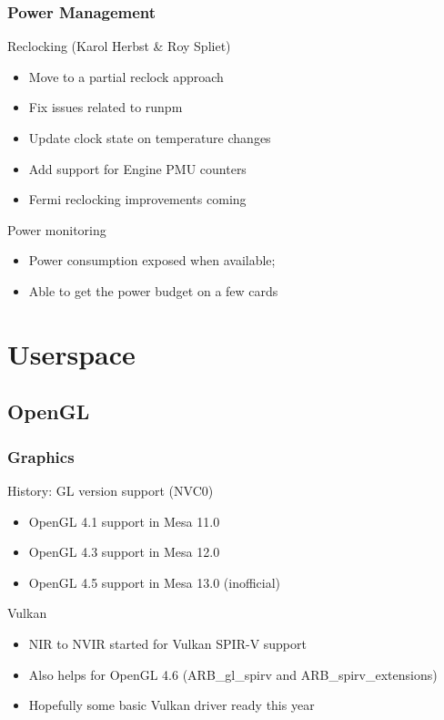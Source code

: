 \documentclass[11pt,english,compress]{beamer}
\begin{document}
\begin{frame}
	\frametitle{Power Management}

	\begin{block}{Reclocking (Karol Herbst \& Roy Spliet)}
		\begin{itemize}
			\item Move to a partial reclock approach
			\item Fix issues related to runpm
			\item Update clock state on temperature changes
			\item Add support for Engine PMU counters
			\item Fermi reclocking improvements coming
		\end{itemize}
	\end{block}

	\begin{block}{Power monitoring}
		\begin{itemize}
			\item Power consumption exposed when available;
			\item Able to get the power budget on a few cards
		\end{itemize}
	\end{block}
\end{frame}

\section{Userspace}
\subsection{OpenGL}

\begin{frame}
	\frametitle{Graphics}

	\begin{block}{History: GL version support (NVC0)}
		\begin{itemize}
			\item OpenGL 4.1 support in Mesa 11.0
			\item OpenGL 4.3 support in Mesa 12.0
			\item OpenGL 4.5 support in Mesa 13.0 (inofficial)
		\end{itemize}
	\end{block}
	
	\pause
	
	\begin{block}{Vulkan}
		\begin{itemize}
			\item NIR to NVIR started for Vulkan SPIR-V support
			\item Also helps for OpenGL 4.6 (ARB\_gl\_spirv and ARB\_spirv\_extensions)
			\item Hopefully some basic Vulkan driver ready this year
		\end{itemize}
	\end{block}
\end{frame}
\end{document}
